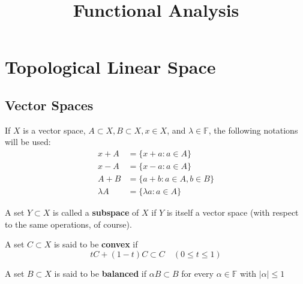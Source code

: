 \documentclass[12pt, oneside]{book}
\begin{document}
\frontmatter
\title{{\Huge{\textbf{Functional Analysis}}}}
\maketitle
{}
\tableofcontents %


\mainmatter
{} %


\chapter{Topological Linear Space}


\section{Vector Spaces} %


\begin{definition}
    If $X$ is a vector space, $A \subset X, B \subset X, x \in X$, and $\lambda \in \mathbb{F}$, the following notations will be used:
    \begin{equation*}
        \begin{aligned}
            x+A       & =\{x+a: a \in A\}          \\
            x-A       & =\{x-a: a \in A\}          \\
            A+B       & =\{a+b: a \in A, b \in B\} \\
            \lambda A & =\{\lambda a: a \in A\}
        \end{aligned}
    \end{equation*}

    A set $Y \subset X$ is called a \textbf{subspace} of $X$ if $Y$ is itself a vector space (with respect to the same operations, of course).

    A set $C \subset X$ is said to be \textbf{convex} if
    \begin{equation*}
        t C+(1-t) C \subset C \quad(0 \leq t \leq 1)
    \end{equation*}

    A set $B \subset X$ is said to be \textbf{balanced} if $\alpha B \subset B$ for every $\alpha \in \mathbb{F}$ with $|\alpha| \leq 1$
\end{definition}
\end{document}

